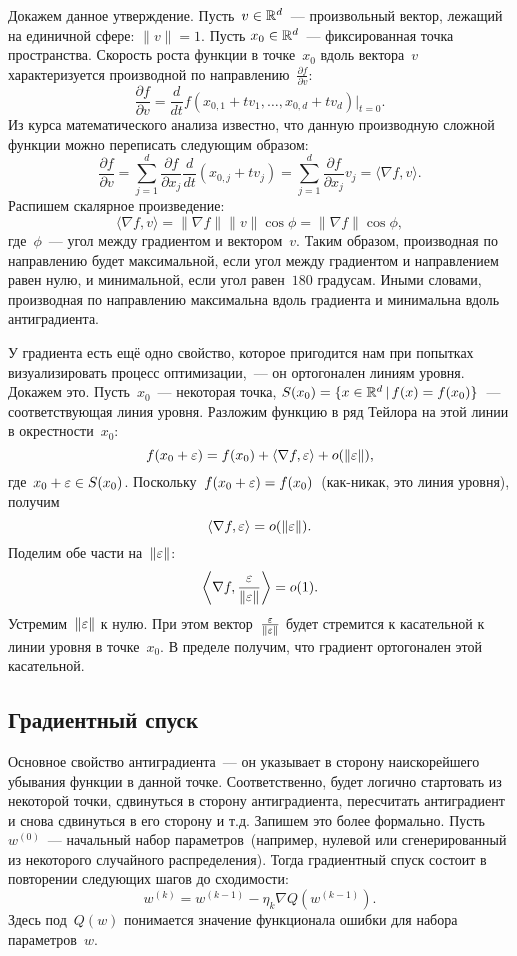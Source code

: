 \documentclass[12pt,fleqn]{article}
\begin{document}
Докажем данное утверждение.
Пусть~$v \in \mathbb{R}^d$~--- произвольный вектор, лежащий на единичной сфере: $\|v\| = 1$.
Пусть $x_0 \in \mathbb{R}^d$~--- фиксированная точка пространства.
Скорость роста функции в точке~$x_0$ вдоль вектора~$v$ характеризуется
производной по направлению~$\frac{\partial f}{\partial v}$:
\[
    \frac{\partial f}{\partial v}
    =
    \frac{d}{dt} f(x_{0,1} + t v_1, \dots, x_{0,d} + t v_d) |_{t = 0}.
\]
Из курса математического анализа известно, что данную производную сложной
функции можно переписать следующим образом:
\[
    \frac{\partial f}{\partial v}
    =
    \sum_{j = 1}^{d}
        \frac{\partial f}{\partial x_j}
        \frac{d}{dt} \left(x_{0,j} + t v_j\right)
    =
    \sum_{j = 1}^{d}
        \frac{\partial f}{\partial x_j}
        v_j
    =
    \langle \nabla f, v \rangle.
\]
Распишем скалярное произведение:
\[
    \langle \nabla f, v \rangle
    =
    \|\nabla f\| \|v\| \cos \phi
    =
    \|\nabla f\| \cos \phi,
\]
где~$\phi$~--- угол между градиентом и вектором~$v$.
Таким образом, производная по направлению будет
максимальной, если угол между градиентом и направлением равен нулю,
и минимальной, если угол равен~$180$ градусам.
Иными словами, производная по направлению максимальна
вдоль градиента и минимальна вдоль антиградиента.

У градиента есть ещё одно свойство, которое пригодится нам при попытках
визуализировать процесс оптимизации,~--- он ортогонален линиям уровня.
Докажем это.
Пусть~$x_0$~--- некоторая точка,
$S(x_0) = \{x \in \mathbb{R}^d \mspace{3mu}{|}\mspace{3mu} f(x) = f(x_0)\}$~--- соответствующая линия уровня.
Разложим функцию в ряд Тейлора на этой линии в окрестности~$x_0$:
\[
    f(x_0 + \varepsilon) = f(x_0) + \langle \nabla f, \varepsilon \rangle + o(\|\varepsilon\|),
\]
где~$x_0 + \varepsilon \in S(x_0)$.
Поскольку~$f(x_0 + \varepsilon) = f(x_0)$~(как-никак, это линия уровня), получим
\[
    \langle \nabla f, \varepsilon \rangle = o(\|\varepsilon\|).
\]
Поделим обе части на~$\|\varepsilon\|$:
\[
    \left\langle \nabla f, \frac{\varepsilon}{\|\varepsilon\|} \right\rangle = o(1).
\]
Устремим~$\|\varepsilon\|$ к нулю.
При этом вектор~$\frac{\varepsilon}{\|\varepsilon\|}$ будет стремится к касательной к линии уровня в точке~$x_0$.
В пределе получим, что градиент ортогонален этой касательной.

\subsection{Градиентный спуск}

Основное свойство антиградиента~--- он указывает в сторону наискорейшего убывания функции в данной точке.
Соответственно, будет логично стартовать из некоторой точки, сдвинуться в сторону антиградиента,
пересчитать антиградиент и снова сдвинуться в его сторону и т.д.
Запишем это более формально.
Пусть~$w^{(0)}$~--- начальный набор параметров~(например, нулевой или сгенерированный из некоторого
случайного распределения).
Тогда градиентный спуск состоит в повторении следующих шагов до сходимости:
\begin{equation}
\label{eq:fullgrad}
    w^{(k)}
    =
    w^{(k - 1)}
    -
    \eta_k
    \nabla Q(w^{(k - 1)}).
\end{equation}
Здесь под~$Q(w)$ понимается значение функционала ошибки для набора параметров~$w$.
\end{document}
